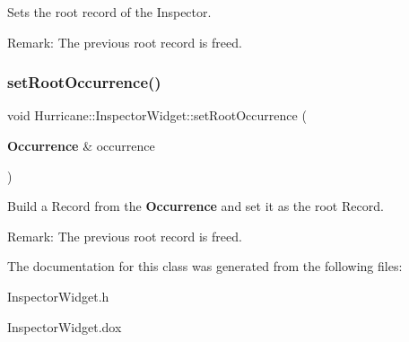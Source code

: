 Sets the root record of the Inspector.

\begin{DoxyParagraph}{Remark\+:}
The previous root record is freed. 
\end{DoxyParagraph}
\mbox{\label{classHurricane_1_1InspectorWidget_a79914005284bdc8426c90f3440714bb4}} 
\subsubsection{\texorpdfstring{set\+Root\+Occurrence()}{setRootOccurrence()}}
{\footnotesize\ttfamily void Hurricane\+::\+Inspector\+Widget\+::set\+Root\+Occurrence (\begin{DoxyParamCaption}\item[{\textbf{ Occurrence} \&}]{occurrence }\end{DoxyParamCaption})}

Build a Record from the \textbf{ Occurrence} and set it as the root Record.

\begin{DoxyParagraph}{Remark\+:}
The previous root record is freed. 
\end{DoxyParagraph}


The documentation for this class was generated from the following files\+:\begin{DoxyCompactItemize}
\item 
Inspector\+Widget.\+h\item 
Inspector\+Widget.\+dox\end{DoxyCompactItemize}
